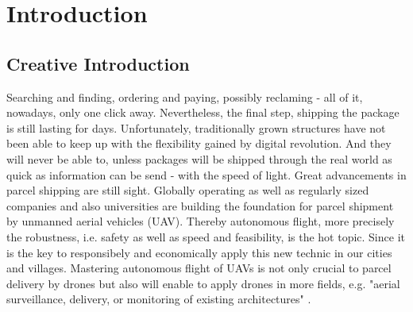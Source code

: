 
\chapter{Introduction} %

\label{Chapter1} %


\section{Creative Introduction}

Searching and finding, ordering and paying, possibly reclaming - 
all of it, nowadays, only one click away.
Nevertheless, the final step, shipping the package is
still lasting for days. 
Unfortunately, traditionally grown structures
have not been able to keep up with the 
flexibility gained by digital revolution.
And they will never be able to, unless
packages will be shipped through the real world
as quick as information can be send - with the speed of light.
Great advancements in parcel shipping are still sight.
Globally operating as well as regularly sized companies and
also universities are building the foundation for 
parcel shipment by unmanned aerial vehicles (UAV).
Thereby autonomous flight, more precisely the robustness, i.e. safety
as well as speed and feasibility, is the hot topic. Since it is the key to
responsibely and economically apply this new technic in our cities and villages.
Mastering autonomous flight of UAVs is not only crucial to 
parcel delivery by drones but also will enable to apply drones in more fields,
e.g. "aerial surveillance, delivery, or monitoring of existing architectures"
\cite{loquercio2018learning}.